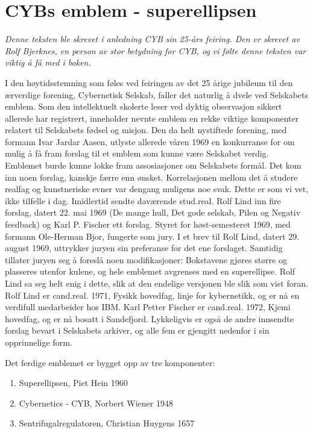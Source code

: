 \chapter{CYBs emblem - superellipsen}

\emph{Denne teksten ble skrevet i anledning CYB sin 25-års feiring. Den er skrevet av Rolf Bjerknes, en person av stor betydning for CYB, og vi følte denne teksten var viktig å få med i boken.}

\author{Rolf Bjerknes}

I den høytidsstemning som føles ved feiringen av det 25 årige jubileum til den ærverdige forening, Cybernetisk Selskab, faller det naturlig å dvele ved Selskabets emblem. Som den intellektuelt skolerte leser ved dyktig observasjon sikkert allerede har registrert, inneholder nevnte emblem en rekke viktige komponenter relatert til Selskabets fødsel og misjon. Den da helt nystiftede forening, med formann Ivar Jardar Aasen, utlyste allerede våren 1969 en konkurranse for om mulig å få fram forslag til et emblem som kunne være Selskabet verdig. Emblemet burde kunne lokke fram assosiasjoner om Selskabets formål. Det kom inn noen forslag, kanskje færre enn ønsket. Korrelasjonen mellom det å studere realfag og kunstneriske evner var dengang muligens noe svak. Dette er som vi vet, ikke tilfelle i dag. Imidlertid sendte daværende stud.real. Rolf Lind inn fire forslag, datert 22. mai 1969 (De mange hull, Det gode selskab, Pilen og Negativ feedback) og Karl P. Fischer ett forslag. Styret for høst-semesteret 1969, med formann Ole-Herman Bjor, fungerte som jury. I et brev til Rolf Lind, datert 29. august 1969, uttrykker juryen sin preferanse for det ene forslaget. Samtidig tillater juryen seg å foreslå noen modifikasjoner: Bokstavene gjøres større og plasseres utenfor kulene, og hele emblemet avgrenses med en superellipse. Rolf Lind sa seg helt enig i dette, slik at den endelige versjonen ble slik som vist foran. Rolf Lind er cand.real. 1971, Fysikk hovedfag, linje for kybernetikk, og er nå en verdifull medarbeider hos IBM. Karl Petter Fischer er cand.real. 1972, Kjemi hovedfag, og er nå bosatt i Sandefjord. Lykkeligvis er også de andre innsendte forslag bevart i Selskabets arkiver, og alle fem er gjengitt nedenfor i sin opprinnelige form.

Det ferdige emblemet er bygget opp av tre komponenter:

\begin{enumerate}
\item Superellipsen, Piet Hein 1960
\item Cybernetics - CYB, Norbert Wiener 1948
\item Sentrifugalregulatoren, Christian Huygens 1657
\end{enumerate}

